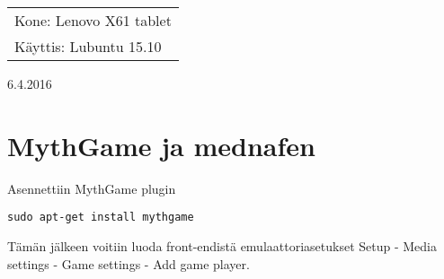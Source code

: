 \documentclass[main.tex]{subfiles}
\begin{document}
\thispagestyle{empty}
\begin{tabular}[t]{l}
Kone: Lenovo X61 tablet\\
Käyttis: Lubuntu 15.10
\end{tabular}
\hfill 6.4.2016

{\section{MythGame ja mednafen}}

Asennettiin MythGame plugin

\begin{lstlisting}
sudo apt-get install mythgame
\end{lstlisting}

Tämän jälkeen voitiin luoda front-endistä emulaattoriasetukset Setup - Media settings - Game settings - Add game player.
\end{document}
